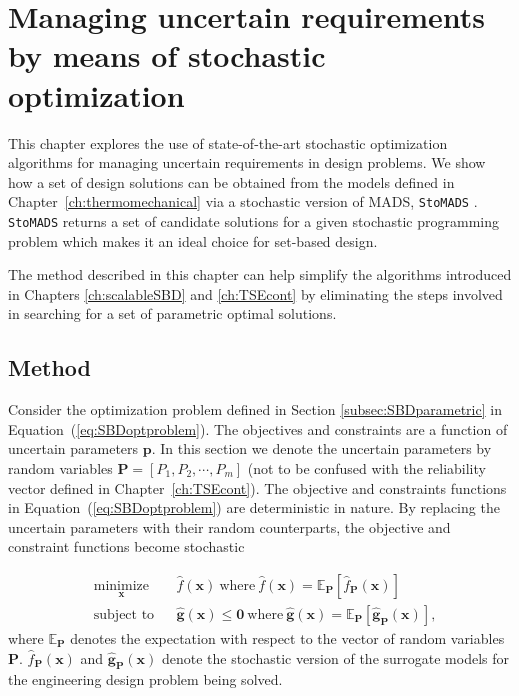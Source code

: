 \chapter{Managing uncertain requirements by means of stochastic optimization}
\label{ch:stohasticopt}

This chapter explores the use of state-of-the-art stochastic optimization algorithms for managing uncertain requirements in design problems. We show how a set of design solutions can be obtained from the models defined in Chapter~\ref{ch:thermomechanical} via a stochastic version of \ac{MADS}, \texttt{StoMADS} \cite{Audet2019}. \texttt{StoMADS} returns a set of candidate solutions for a given stochastic programming problem which makes it an ideal choice for set-based design.

The method described in this chapter can help simplify the algorithms introduced in Chapters \ref{ch:scalableSBD} and \ref{ch:TSEcont} by eliminating the steps involved in searching for a set of parametric optimal solutions.

\section{Method} \label{sec:STOmethods}

Consider the optimization problem defined in Section \ref{subsec:SBDparametric} in Equation~(\ref{eq:SBDoptproblem}). The objectives and constraints are a function of uncertain parameters $\mathbf{p}$. In this section we denote the uncertain parameters by random variables $\mathbf{P} = \left[P_1,P_2,\cdots,P_m\right]$ (not to be confused with the reliability vector defined in Chapter~\ref{ch:TSEcont}). The objective and constraints functions in Equation~(\ref{eq:SBDoptproblem}) are deterministic in nature. By replacing the uncertain parameters with their random counterparts, the objective and constraint functions become stochastic

\begin{equation}
	\begin{aligned}
		& \underset{\mathbf{x}}{\text{minimize}}
		& & \hat{f}(\mathbf{x})~\textrm{where}~\hat{f}(\mathbf{x})=\mathbb{E}_{\mathbf{P}}\left[\hat{f}_{\mathbf{P}}(\mathbf{x})\right]\\
		& \text{subject to}
		& & \hat{\mathbf{g}}(\mathbf{x}) \le \mathbf{0}~\textrm{where}~\hat{\mathbf{g}}(\mathbf{x})=\mathbb{E}_{\mathbf{P}}\left[\hat{\mathbf{g}}_{\mathbf{P}}(\mathbf{x})\right],
	\end{aligned}
	\label{eq:STOoptproblem}
\end{equation}
%
where $\mathbb{E}_{\mathbf{P}}$ denotes the expectation with respect to the vector of random variables $\mathbf{P}$. $\hat{f}_{\mathbf{P}}(\mathbf{x})$ and $\hat{\mathbf{g}}_{\mathbf{P}}(\mathbf{x})$ denote the stochastic version of the surrogate models for the engineering design problem being solved.

